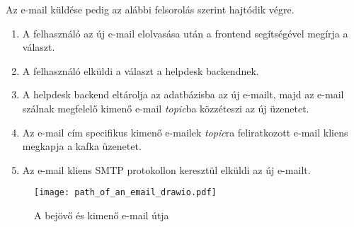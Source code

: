 \bigskip
Az e-mail küldése pedig az alábbi felsorolás szerint hajtódik végre.
\begin{enumerate}
	\item A felhasználó az új e-mail elolvasása után a frontend segítségével megírja a választ.
	\item A felhasználó elküldi a választ a helpdesk backendnek.
	\item A helpdesk backend eltárolja az adatbázisba az új e-mailt, majd az e-mail szálnak megfelelő kimenő e-mail \emph{topic}ba közzéteszi az új üzenetet.
	\item Az e-mail cím specifikus kimenő e-mailek \emph{topic}ra feliratkozott e-mail kliens megkapja a kafka üzenetet.
	\item Az e-mail kliens SMTP protokollon keresztül elküldi az új e-mailt.
\end{enumerate}


\begin{figure}[hbt] 
	\centering
	\texttt{[image: path\_of\_an\_email\_drawio.pdf]}
	\caption{A bejövő és kimenő e-mail útja}
	\label{fig:path_of_an_email}
\end{figure}

